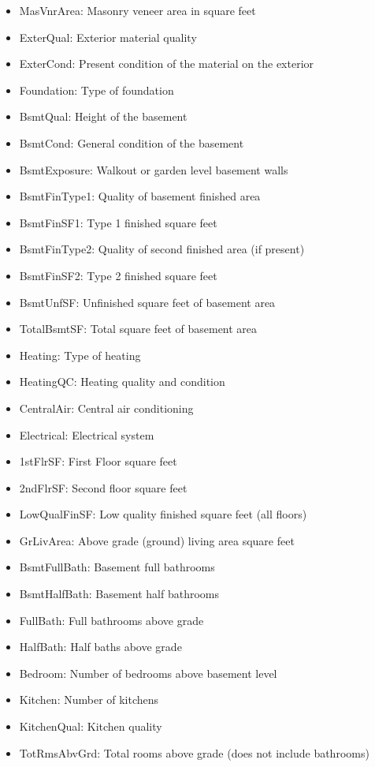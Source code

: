 \documentclass[sigconf]{acmart}
\begin{document}
\begin{itemize}
		\item MasVnrArea: Masonry veneer area in square feet
		\item ExterQual: Exterior material quality
		\item ExterCond: Present condition of the material on the exterior
		\item Foundation: Type of foundation
		\item BsmtQual: Height of the basement
		\item BsmtCond: General condition of the basement
		\item BsmtExposure: Walkout or garden level basement walls
		\item BsmtFinType1: Quality of basement finished area
		\item BsmtFinSF1: Type 1 finished square feet
		\item BsmtFinType2: Quality of second finished area (if present)
		\item BsmtFinSF2: Type 2 finished square feet
		\item BsmtUnfSF: Unfinished square feet of basement area
		\item TotalBsmtSF: Total square feet of basement area
		\item Heating: Type of heating
		\item HeatingQC: Heating quality and condition
		\item CentralAir: Central air conditioning
		\item Electrical: Electrical system
		\item 1stFlrSF: First Floor square feet
		\item 2ndFlrSF: Second floor square feet
		\item LowQualFinSF: Low quality finished square feet (all floors)
		\item GrLivArea: Above grade (ground) living area square feet
		\item BsmtFullBath: Basement full bathrooms
		\item BsmtHalfBath: Basement half bathrooms
		\item FullBath: Full bathrooms above grade
		\item HalfBath: Half baths above grade
		\item Bedroom: Number of bedrooms above basement level
		\item Kitchen: Number of kitchens
		\item KitchenQual: Kitchen quality
		\item TotRmsAbvGrd: Total rooms above grade (does not include bathrooms)

\end{itemize}
\end{document}
